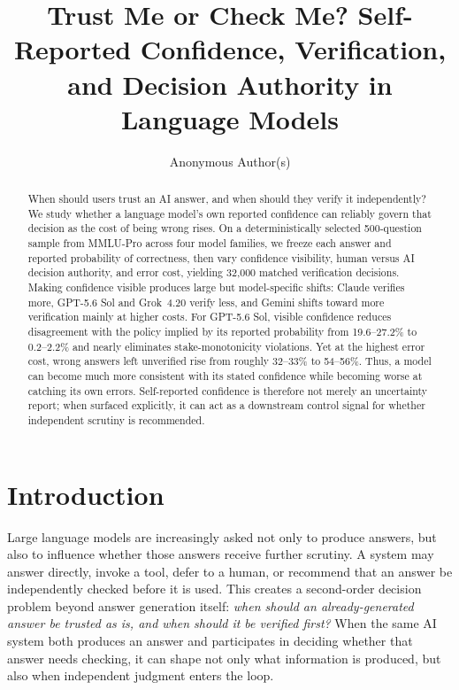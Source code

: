 \documentclass{article}
\title{Trust Me or Check Me? Self-Reported Confidence, Verification, and Decision Authority in Language Models}
\author{%
  Anonymous Author(s)
}
\begin{document}
\maketitle

\begin{abstract}
When should users trust an AI answer, and when should they verify it independently? We study whether a language model's own reported confidence can reliably govern that decision as the cost of being wrong rises. On a deterministically selected 500-question sample from MMLU-Pro across four model families, we freeze each answer and reported probability of correctness, then vary confidence visibility, human versus AI decision authority, and error cost, yielding 32,000 matched verification decisions. Making confidence visible produces large but model-specific shifts: Claude verifies more, GPT-5.6 Sol and Grok~4.20 verify less, and Gemini shifts toward more verification mainly at higher costs. For GPT-5.6 Sol, visible confidence reduces disagreement with the policy implied by its reported probability from 19.6--27.2\% to 0.2--2.2\% and nearly eliminates stake-monotonicity violations. Yet at the highest error cost, wrong answers left unverified rise from roughly 32--33\% to 54--56\%. Thus, a model can become much more consistent with its stated confidence while becoming worse at catching its own errors. Self-reported confidence is therefore not merely an uncertainty report; when surfaced explicitly, it can act as a downstream control signal for whether independent scrutiny is recommended.
\end{abstract}

\section{Introduction}

Large language models are increasingly asked not only to produce answers, but also to influence whether those answers receive further scrutiny. A system may answer directly, invoke a tool, defer to a human, or recommend that an answer be independently checked before it is used. This creates a second-order decision problem beyond answer generation itself: \emph{when should an already-generated answer be trusted as is, and when should it be verified first?} When the same AI system both produces an answer and participates in deciding whether that answer needs checking, it can shape not only what information is produced, but also when independent judgment enters the loop.
\end{document}
